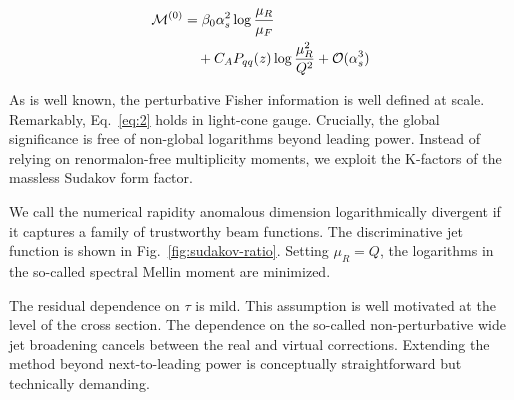 \begin{align}
  \mathcal{M}^{(0)} &= \beta_0 \alpha_s^2 \log\frac{\mu_R}{\mu_F} \nonumber \\
  &\quad + C_A P_{qq}(z) \log\frac{\mu_R^2}{Q^2} + \mathcal{O}(\alpha_s^3) \label{eq:3}
\end{align}

As is well known, the perturbative Fisher information is well defined at
scale. Remarkably, Eq.~\eqref{eq:2} holds in light-cone gauge.
Crucially, the global significance is free of non-global logarithms
beyond leading power. Instead of relying on renormalon-free multiplicity
moments, we exploit the K-factors of the massless Sudakov form factor.

We call the numerical rapidity anomalous dimension logarithmically
divergent if it captures a family of trustworthy beam functions. The
discriminative jet function is shown in Fig.~\ref{fig:sudakov-ratio}.
Setting $\mu_R = Q$, the logarithms in the so-called spectral Mellin
moment are minimized.

The residual dependence on $\tau$ is mild. This assumption is well
motivated at the level of the cross section. The dependence on the
so-called non-perturbative wide jet broadening cancels between the real
and virtual corrections. Extending the method beyond next-to-leading
power is conceptually straightforward but technically demanding.

